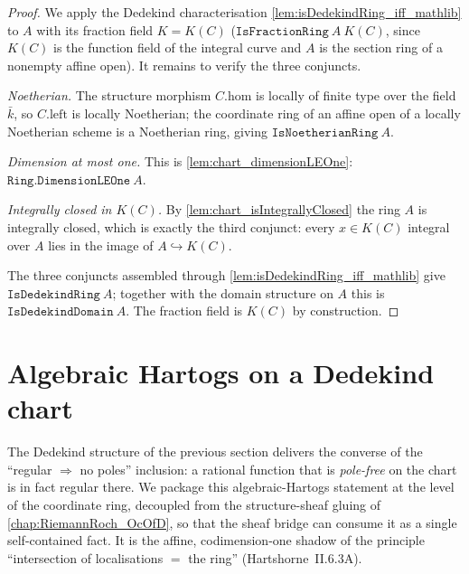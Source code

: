 \begin{proof}
        \leanok
  We apply the Dedekind characterisation
  \cref{lem:isDedekindRing_iff_mathlib} to \(A\) with its fraction field
  \(K = K(C)\) (\(\texttt{IsFractionRing}\ A\ K(C)\), since \(K(C)\) is the
  function field of the integral curve and \(A\) is the section ring of a
  nonempty affine open). It remains to verify the three conjuncts.

  \emph{Noetherian.} The structure morphism \(C.\mathrm{hom}\) is locally of
  finite type over the field \(\bar k\), so \(C.\mathrm{left}\) is locally
  Noetherian; the coordinate ring of an affine open of a locally Noetherian
  scheme is a Noetherian ring, giving \(\texttt{IsNoetherianRing}\ A\).

  \emph{Dimension at most one.} This is \cref{lem:chart_dimensionLEOne}:
  \(\texttt{Ring.DimensionLEOne}\ A\).

  \emph{Integrally closed in \(K(C)\).} By
  \cref{lem:chart_isIntegrallyClosed} the ring \(A\) is integrally closed,
  which is exactly the third conjunct: every \(x \in K(C)\) integral over \(A\)
  lies in the image of \(A \hookrightarrow K(C)\).

  The three conjuncts assembled through
  \cref{lem:isDedekindRing_iff_mathlib} give \(\texttt{IsDedekindRing}\ A\);
  together with the domain structure on \(A\) this is
  \(\texttt{IsDedekindDomain}\ A\). The fraction field is \(K(C)\) by
  construction.
\end{proof}

\section{Algebraic Hartogs on a Dedekind chart}

The Dedekind structure of the previous section delivers the converse of the
``regular \(\Rightarrow\) no poles'' inclusion: a rational function that is
\emph{pole-free} on the chart is in fact regular there. We package this
algebraic-Hartogs statement at the level of the coordinate ring, decoupled from
the structure-sheaf gluing of \cref{chap:RiemannRoch_OcOfD}, so that the
sheaf bridge can consume it as a single self-contained fact. It is the affine,
codimension-one shadow of the principle ``intersection of localisations \(=\)
the ring'' (Hartshorne~II.6.3A).


